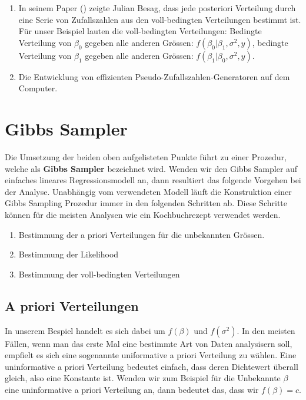\documentclass[]{book}
\providecommand{\tightlist}{%
  \setlength{\itemsep}{0pt}\setlength{\parskip}{0pt}}
\begin{document}
\begin{enumerate}
\def\labelenumi{\arabic{enumi}.}
\tightlist
\item
  In seinem Paper (\citet{Besa1974}) zeigte Julian Besag, dass jede
  posteriori Verteilung durch eine Serie von Zufallszahlen aus den
  voll-bedingten Verteilungen bestimmt ist. Für unser Beispiel lauten
  die voll-bedingten Verteilungen: Bedingte Verteilung von \(\beta_0\)
  gegeben alle anderen Grössen: \(f(\beta_0 | \beta_1, \sigma^2, y)\),
  bedingte Verteilung von \(\beta_1\) gegeben alle anderen Grössen:
  \(f(\beta_1 | \beta_0, \sigma^2, y)\).
\item
  Die Entwicklung von effizienten Pseudo-Zufallszahlen-Generatoren auf
  dem Computer.
\end{enumerate}

\section{Gibbs Sampler}\label{gibbs-sampler}

Die Umsetzung der beiden oben aufgelisteten Punkte führt zu einer
Prozedur, welche als \textbf{Gibbs Sampler} bezeichnet wird. Wenden wir
den Gibbs Sampler auf einfaches lineares Regressionsmodell an, dann
resultiert das folgende Vorgehen bei der Analyse. Unabhängig vom
verwendeten Modell läuft die Konstruktion einer Gibbs Sampling Prozedur
immer in den folgenden Schritten ab. Diese Schritte können für die
meisten Analysen wie ein Kochbuchrezept verwendet werden.

\begin{enumerate}
\def\labelenumi{\arabic{enumi}.}
\tightlist
\item
  Bestimmung der a priori Verteilungen für die unbekannten Grössen.
\item
  Bestimmung der Likelihood
\item
  Bestimmung der voll-bedingten Verteilungen
\end{enumerate}

\subsection{A priori Verteilungen}\label{a-priori-verteilungen}

In unserem Bespiel handelt es sich dabei um \(f(\beta)\) und
\(f(\sigma^2)\). In den meisten Fällen, wenn man das erste Mal eine
bestimmte Art von Daten analysisern soll, empfielt es sich eine
sogenannte uniformative a priori Verteilung zu wählen. Eine
uninformative a priori Verteilung bedeutet einfach, dass deren
Dichtewert überall gleich, also eine Konstante ist. Wenden wir zum
Beispiel für die Unbekannte \(\beta\) eine uninformative a priori
Verteilung an, dann bedeutet das, dass wir \(f(\beta) = c\).
\end{document}
